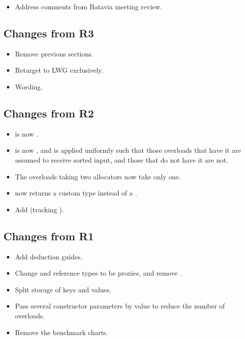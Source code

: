 \begin{itemize}
  \item Address comments from Batavia meeting review.
\end{itemize}

\subsection{Changes from R3}

\begin{itemize}
  \item Remove previous sections.
  \item Retarget to LWG exclusively.
  \item Wording.
\end{itemize}

\subsection{Changes from R2}

\begin{itemize}
  \item {} is now .
  \item {} is now , and
    is applied uniformly such that those overloads that have it are assumed to
    receive sorted input, and those that do not have it are not.
  \item The overloads taking two allocators now take only one.
  \item {} now returns a custom type instead of a .
  \item Add  (tracking ).
\end{itemize}

\subsection{Changes from R1}

\begin{itemize}
  \item Add deduction guides.
  \item Change  and reference types to be proxies, and remove
    .
  \item Split storage of keys and values.
  \item Pass several constructor parameters by value to reduce the number of overloads.
  \item Remove the benchmark charts.
\end{itemize}

